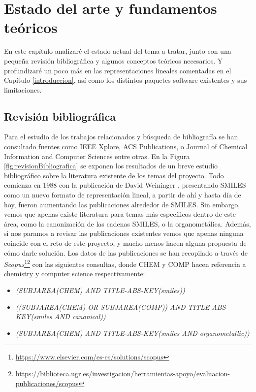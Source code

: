 
\chapter{Estado del arte y fundamentos teóricos}\label{estadoArte}

En este capítulo analizaré el estado actual del tema a tratar, junto con una pequeña revisión bibliográfica y algunos conceptos teóricos necesarios. Y profundizaré un poco más en las representaciones lineales comentadas en el Capítulo \ref{introduccion}, así como los distintos paquetes software existentes y sus limitaciones. 

\section{Revisión bibliográfica} \label{revision_bib}
Para el estudio de los trabajos relacionados y búsqueda de bibliografía se han consultado fuentes como IEEE Xplore, ACS Publications, o Journal of Chemical Information and Computer Sciences entre otras. En la Figura \ref{fig:revisionBibliografica} se exponen los resultados de un breve estudio bibliográfico sobre la literatura existente de los temas del proyecto. Todo comienza en 1988 con la publicación de David Weininger \cite{weininger_smiles_1988}, presentando SMILES como un nuevo formato de representación lineal, a partir de ahí y hasta día de hoy, fueron aumentando las publicaciones alrededor de SMILES. Sin embargo, vemos que apenas existe literatura para temas más específicos dentro de este área, como la canonización de las cadenas SMILES, o la organometálica. Además, si nos paramos a revisar las publicaciones existentes vemos que apenas ninguna coincide con el reto de este proyecto, y mucho menos hacen alguna propuesta de cómo darle solución. Los datos de las publicaciones se han recopilado a través de \textit{Scopus}\footnote{\url{https://www.elsevier.com/es-es/solutions/scopus}}\footnotecomma\footnote{\url{https://biblioteca.ugr.es/investigacion/herramientas-apoyo/evaluacion-publicaciones/scopus}} con las siguientes consultas, donde CHEM y COMP hacen referencia a chemistry y computer science respectivamente: 
\begin{itemize}
    \item {\footnotesize \textit{(SUBJAREA(CHEM) AND TITLE-ABS-KEY(smiles))}} 
    \item {\footnotesize \textit{((SUBJAREA(CHEM) OR SUBJAREA(COMP)) AND TITLE-ABS-KEY(smiles AND canonical))}}
    \item {\footnotesize \textit{(SUBJAREA(CHEM) AND TITLE-ABS-KEY(smiles AND organometallic))}}
\end{itemize}

